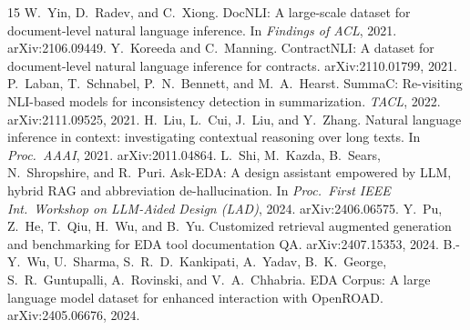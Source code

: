 \documentclass[11pt]{article}
\begin{document}
\begin{thebibliography}{15}
 W.~Yin, D.~Radev, and C.~Xiong. DocNLI: A large-scale dataset for document-level natural language inference. In \emph{Findings of ACL}, 2021. arXiv:2106.09449.
 Y.~Koreeda and C.~Manning. ContractNLI: A dataset for document-level natural language inference for contracts. arXiv:2110.01799, 2021.
 P.~Laban, T.~Schnabel, P.~N.~Bennett, and M.~A.~Hearst. SummaC: Re-visiting NLI-based models for inconsistency detection in summarization. \emph{TACL}, 2022. arXiv:2111.09525, 2021.
 H.~Liu, L.~Cui, J.~Liu, and Y.~Zhang. Natural language inference in context: investigating contextual reasoning over long texts. In \emph{Proc.\ AAAI}, 2021. arXiv:2011.04864.
 L.~Shi, M.~Kazda, B.~Sears, N.~Shropshire, and R.~Puri. Ask-EDA: A design assistant empowered by LLM, hybrid RAG and abbreviation de-hallucination. In \emph{Proc.\ First IEEE Int.\ Workshop on LLM-Aided Design (LAD)}, 2024. arXiv:2406.06575.
 Y.~Pu, Z.~He, T.~Qiu, H.~Wu, and B.~Yu. Customized retrieval augmented generation and benchmarking for EDA tool documentation QA. arXiv:2407.15353, 2024.
 B.-Y.~Wu, U.~Sharma, S.~R.~D.~Kankipati, A.~Yadav, B.~K.~George, S.~R.~Guntupalli, A.~Rovinski, and V.~A.~Chhabria. EDA Corpus: A large language model dataset for enhanced interaction with OpenROAD. arXiv:2405.06676, 2024.
\end{thebibliography}
\end{document}
